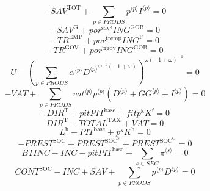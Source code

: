 \begin{equation}
-{S\!A\!V}^{\mathrm{TOT}} + \sum_{p\in {P\!R\!O\!D\!S}} {{p}^{\langle p\rangle}} {{I}^{\langle p\rangle}} = 0
\end{equation}
\begin{equation}
-{S\!A\!V}^{\mathrm{G}} + {{p\!o\!r}^{\mathrm{sav}^{\mathrm{g}}}} {{I\!N\!G}^{\mathrm{GOB}}} = 0
\end{equation}
\begin{equation}
-{T\!R}^{\mathrm{EMP}} + {{p\!o\!r}^{\mathrm{tremp}}} {{I\!N\!G}^{\mathrm{F}}} = 0
\end{equation}
\begin{equation}
-{T\!R}^{\mathrm{GOV}} + {{p\!o\!r}^{\mathrm{trgov}}} {{I\!N\!G}^{\mathrm{GOB}}} = 0
\end{equation}
\begin{equation}
U - \left(\sum_{p\in {P\!R\!O\!D\!S}} {{\alpha}^{\langle p\rangle}} {{{D}^{\langle p\rangle}}^{{\omega}^{-1} \left(-1 + \omega\right)}}\right)^{{\omega} \left(-1 + \omega\right)^{-1}} = 0
\end{equation}
\begin{equation}
-{V\!A\!T} + \sum_{p\in {P\!R\!O\!D\!S}} {{{v\!a\!t}}^{\langle p\rangle}} {{p}^{\langle p\rangle}} \left({D}^{\langle p\rangle} + {{G\!G}}^{\langle p\rangle} + {I}^{\langle p\rangle}\right) = 0
\end{equation}
\begin{equation}
-{D\!I\!R}^{\mathrm{T}} + {{p\!i\!t}} {{P\!I\!T}^{\mathrm{base}}} + {{f\!i\!t}} {p^{\mathrm{k}}} {K^{\mathrm{f}}} = 0
\end{equation}
\begin{equation}
{D\!I\!R}^{\mathrm{T}} - {T\!O\!T\!A\!L}^{\mathrm{TAX}} + {V\!A\!T} = 0
\end{equation}
\begin{equation}
L^{\mathrm{h}} - {P\!I\!T}^{\mathrm{base}} + {p^{\mathrm{k}}} {K^{\mathrm{h}}} = 0
\end{equation}
\begin{equation}
-{P\!R\!E\!S\!T}^{\mathrm{SOC}} + {P\!R\!E\!S\!T}^{\mathrm{SOC}^{\mathrm{F}}} + {P\!R\!E\!S\!T}^{\mathrm{SOC}^{\mathrm{G}}} = 0
\end{equation}
\begin{equation}
{B\!T\!I\!N\!C} - {I\!N\!C} - {{p\!i\!t}} {{P\!I\!T}^{\mathrm{base}}} + \sum_{s\in {S\!E\!C}} {\pi}^{\langle s\rangle} = 0
\end{equation}
\begin{equation}
{C\!O\!N\!T}^{\mathrm{SOC}} - {I\!N\!C} + {S\!A\!V} + \sum_{p\in {P\!R\!O\!D\!S}} {{p}^{\langle p\rangle}} {{D}^{\langle p\rangle}} = 0
\end{equation}
